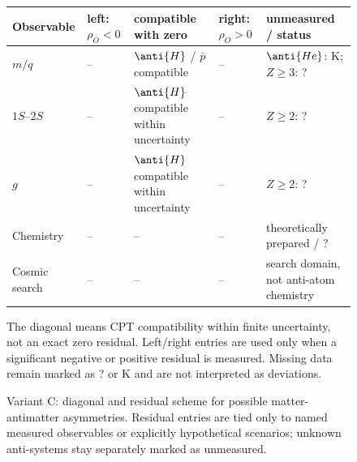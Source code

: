 
\begin{figure}[H]
\centering
\scriptsize
\setlength{\tabcolsep}{2pt}
\renewcommand{\arraystretch}{1.25}
\begin{tabular}{L{0.18\textwidth}L{0.15\textwidth}L{0.20\textwidth}L{0.15\textwidth}L{0.20\textwidth}}
\toprule
\textbf{Observable} & \textbf{left: $\rho_O<0$} & \textbf{compatible with zero} & \textbf{right: $\rho_O>0$} & \textbf{unmeasured / status}\\
\midrule
$m/q$ & -- & $\anti{H}$ / $\bar p$ compatible & -- & $\anti{He}$: K; $Z\geq3$: ?\\
$1S$--$2S$ & -- & $\anti{H}$ compatible within uncertainty & -- & $Z\geq2$: ?\\
$g$ & -- & $\anti{H}$ compatible within uncertainty & -- & $Z\geq2$: ?\\
Chemistry & -- & -- & -- & theoretically prepared / ?\\
Cosmic search & -- & -- & -- & search domain, not anti-atom chemistry\\
\bottomrule
\end{tabular}

\vspace{0.45em}
\scriptsize
The diagonal means CPT compatibility within finite uncertainty, not an exact zero residual. Left/right entries are used only when a significant negative or positive residual is measured. Missing data remain marked as ? or K and are not interpreted as deviations.
\caption{Variant C: diagonal and residual scheme for possible matter-antimatter asymmetries. Residual entries are tied only to named measured observables or explicitly hypothetical scenarios; unknown anti-systems stay separately marked as unmeasured.}
\label{fig:asymmetry-map}
\end{figure}
